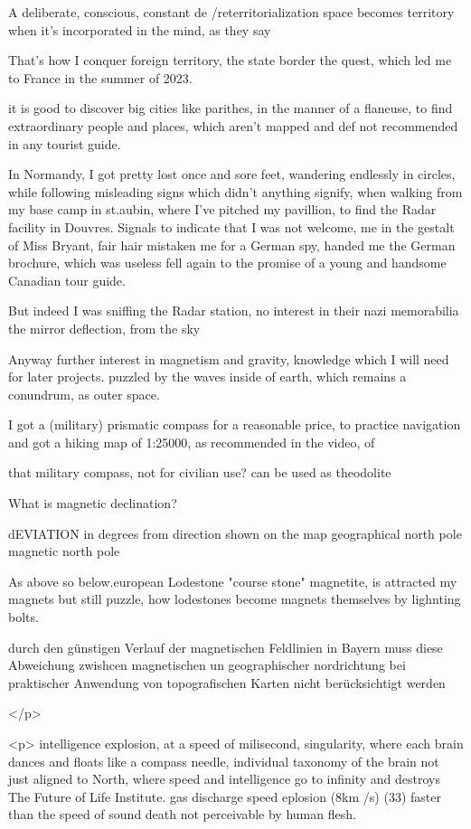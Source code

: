 \documentclass{article}
\begin{document}
A deliberate, conscious, constant de /reterritorialization
space becomes territory when it's incorporated in the mind, as they say

That's how I conquer foreign territory, the state border 
the quest, which led me to France in the summer of 2023.

it is good to discover big cities like parithes, in the manner of a flaneuse, 
to find extraordinary people and places, which aren't mapped and def not recommended in any tourist guide.

In Normandy, I got pretty lost once and sore feet, 
wandering endlessly in circles, while following misleading signs which didn't anything signify,
when walking from my base camp in st.aubin, where I've pitched my pavillion,  
to find the Radar facility in Douvres.
Signals to indicate that I was not welcome, me in the gestalt of Miss Bryant, fair hair 
mistaken me for a German spy, handed me the German brochure, which was useless
fell again to the promise of a young and handsome Canadian tour guide. 


But indeed I was sniffing the Radar station, no interest in their nazi memorabilia
the mirror deflection, from the sky




Anyway further interest in magnetism and gravity, knowledge which I will need for later projects.
puzzled by the waves inside of earth, which remains a conundrum, as outer space.


I got a (military) prismatic compass for a reasonable price, to practice navigation
and got a hiking map of 1:25000, as recommended in the video,
of 

that military compass, not for civilian use?
can be used as theodolite


What is magnetic declination? 


dEVIATION in degrees from direction shown on the map 
geographical north pole 
magnetic north pole

As above so below.european
Lodestone "course stone"
magnetite, is attracted my magnets but 
still puzzle, how lodestones become magnets themselves
by lighnting bolts.


durch den günstigen Verlauf der magnetischen Feldlinien in Bayern 
muss diese Abweichung zwishcen magnetischen un geographischer nordrichtung
bei praktischer Anwendung von topografischen Karten nicht berücksichtigt werden


</p>

<p>
intelligence explosion, at a speed of milisecond, singularity,
where each brain dances and floats like a compass needle, 
individual taxonomy of the brain
not just aligned to North, 
where speed and intelligence go to infinity
and destroys The Future of Life Institute. 
gas discharge speed eplosion (8km /s) (33)
faster than the speed of sound
death not perceivable by human flesh. 
\end{document}
